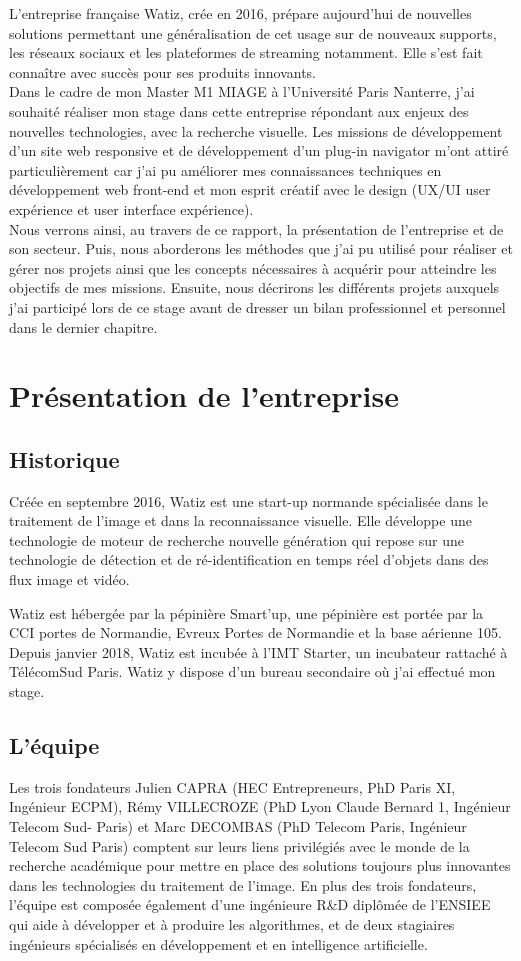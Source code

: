 \documentclass[a4paper, 12pt]{report}
\begin{document}
L’entreprise française Watiz, crée en 2016, prépare aujourd’hui de nouvelles solutions permettant une généralisation de cet usage sur de nouveaux supports, les réseaux sociaux et les plateformes de streaming notamment. Elle s'est fait connaître avec succès pour ses produits innovants.\\

Dans le cadre de mon Master M1 MIAGE à l'Université Paris Nanterre, j'ai souhaité réaliser mon stage dans cette entreprise répondant aux enjeux des nouvelles technologies, avec la recherche visuelle. Les missions de développement d’un site web responsive et de développement d’un plug-in navigator m'ont attiré particulièrement car j’ai pu améliorer mes connaissances techniques en développement web front-end et mon esprit créatif avec le design (UX/UI user expérience et user interface expérience).\\

Nous verrons ainsi, au travers de ce rapport, la présentation de l'entreprise et de son secteur. Puis, nous aborderons les méthodes que j’ai pu utilisé pour réaliser et gérer nos projets ainsi que les concepts nécessaires à acquérir pour atteindre les objectifs de mes missions. 
Ensuite, nous décrirons les différents projets auxquels j’ai participé lors de ce stage avant de dresser un bilan professionnel et personnel dans le dernier chapitre. 
\chapter{Présentation de l'entreprise}
\section{Historique}
Créée en septembre 2016, Watiz est une start-up normande spécialisée dans le traitement de l'image et dans la reconnaissance visuelle. Elle développe une technologie de moteur de recherche nouvelle génération qui repose sur une technologie de détection et de ré-identification en temps réel d'objets dans des flux image et vidéo.

Watiz est hébergée par la pépinière Smart’up, une pépinière est portée par la CCI portes de Normandie, Evreux Portes de Normandie et la base aérienne 105. 
Depuis janvier 2018, Watiz est incubée à l’IMT Starter, un incubateur rattaché à TélécomSud Paris. Watiz y dispose d’un bureau secondaire où j’ai effectué mon stage.
\section{L’équipe}
Les trois fondateurs Julien CAPRA (HEC Entrepreneurs, PhD Paris XI, Ingénieur ECPM), Rémy VILLECROZE (PhD Lyon Claude Bernard 1, Ingénieur Telecom Sud- Paris) et Marc DECOMBAS (PhD Telecom Paris, Ingénieur Telecom Sud Paris) comptent sur leurs liens privilégiés avec le monde de la recherche académique pour mettre en place des solutions toujours plus innovantes dans les technologies du traitement de l’image. 
En plus des trois fondateurs, l’équipe est composée également
d’une ingénieure R\&D diplômée de l’ENSIEE qui aide à développer et à produire les algorithmes, et de 
deux stagiaires ingénieurs spécialisés en développement et en intelligence artificielle.
\end{document}
